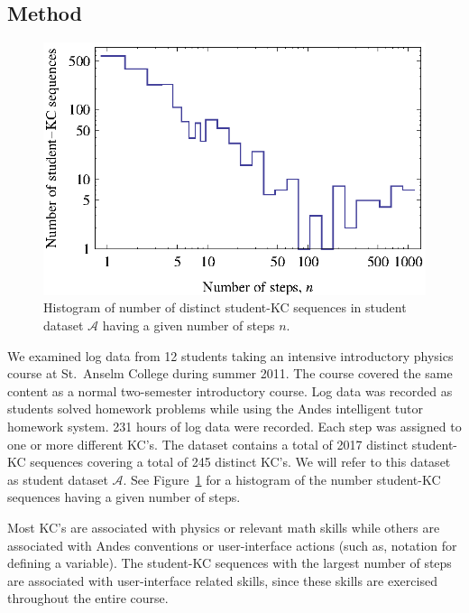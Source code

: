\documentclass{edm_template}
\begin{document}
\subsection{Method}


\begin{figure}
  \centering \includegraphics{student-kc-length-histogram.eps}
  \caption{Histogram of number of distinct student-KC sequences in student 
    dataset $\mathcal{A}$ having a given number of steps $n$.}
    \label{student-length-histogram}
\end{figure}

We examined log data from 12 students taking an intensive introductory
physics course at St.\ Anselm College during summer 2011.  The course
covered the same content as a normal two-semester introductory course.
Log data was recorded as students solved homework problems while using
the Andes intelligent tutor homework system.  231 hours of log data
were recorded.
Each step was assigned to one or more different KC's.  The dataset
contains a total of 2017 distinct student-KC sequences covering a total of
245 distinct KC's.  We will refer to this dataset as student dataset
$\mathcal{A}$.  See Figure~\ref{student-length-histogram} for a
histogram of the number student-KC sequences having a given number of
steps.

Most KC's are associated with physics
or relevant math skills while others are associated with 
Andes conventions or user-interface actions (such as, notation
for defining a variable).  The student-KC sequences with the largest 
number of steps are associated with user-interface related skills,
since these skills are exercised throughout the entire course. 
\end{document}
